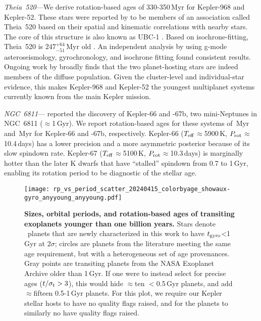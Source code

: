 \documentclass[11pt,twocolumn,tighten]{aastex63}
\begin{document}
{\it Theia~520}---We derive rotation-based ages of 330-350\,Myr for
Kepler-968 and Kepler-52.  These stars were reported by
\citet{2019AJ....158..122K} to be members of an association called
Theia~520 based on their spatial and kinematic correlations with
nearby stars.  The core of this structure is also known as UBC-1
\citep{2018A&A...618A..59C}.  Based on isochrone-fitting,
Theia~520 is $247^{+64}_{-51}$\,Myr old \citep{2019AJ....158..122K}.
An independent analysis by \citet{2024A&A...681A..13F} using g-mode
asteroseismology, gyrochronology, and isochrone fitting found
consistent results.  Ongoing work by \citet{Curtis2024} broadly finds
that the two planet-hosting stars are indeed members of the diffuse
population.  Given the cluster-level and individual-star evidence,
this makes Kepler-968 and Kepler-52 the youngest multiplanet systems
currently known from the main Kepler mission.

{\it NGC~6811}---\citet{Meibom_2013} reported the discovery of
Kepler-66 and -67b, two mini-Neptunes in NGC~6811 ($\approx$1\,Gyr).
We report rotation-based ages for these systems of
\kepsixsixtgyro\,Myr and \kepsixseventgyro\,Myr for Kepler-66 and
-67b, respectively.  Kepler-66 ($T_{\rm eff}$$\approx$5900\,K, $P_{\rm
rot}$$\approx$10.4\,days) has a lower precision and a more asymmetric
posterior because of its slow spindown rate.  Kepler-67 ($T_{\rm eff}$$\approx$5100\,K, $P_{\rm
rot}$$\approx$10.3\,days) is marginally hotter than the later K dwarfs
that have ``stalled'' spindown from 0.7 to 1\,Gyr, enabling its
rotation period to be diagnostic of the stellar age.

\begin{figure}[!t]
  \begin{center}
    \texttt{[image: rp\_vs\_period\_scatter\_20240415\_colorbyage\_showaux-gyro\_anyyoung\_anyyoung.pdf]}
  \end{center}
  \vspace{-0.5cm}
  \caption{
    {\bf Sizes, orbital periods, and rotation-based ages of transiting
    exoplanets younger than one billion years.} Stars denote
    \nplyounggyrotwosigmanograzingnoruwe\ planets that are newly
    characterized in this work to have $t_{\rm gyro}$<1\,Gyr at
    $2$$\sigma$; circles are planets from the literature meeting the
    same age requirement, but with a heterogeneous set of age
    provenances.  Gray points are transiting planets from the NASA
    Exoplanet Archive older than 1\,Gyr.  If one were to instead
    select for precise ages ($t/\sigma_{\rm t}>3$), this would hide
    $\approx$ten $<$0.5\,Gyr planets, and add $\approx$fifteen
    0.5-1\,Gyr planets.  For this plot, we require our Kepler stellar
    hosts to have no quality flags raised, and for the planets to
    similarly no have quality flags raised. 
    \label{fig:rp_period_age_results}
  }
\end{figure}
\end{document}
